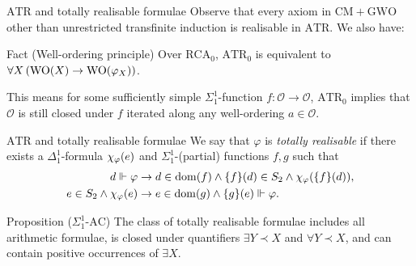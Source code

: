 \documentclass{beamer}
\DeclareMathOperator{\dom}{dom}
\DeclareMathOperator{\WO}{WO}
\begin{document}
\begin{frame}{$\mathrm{ATR}$ and totally realisable formulae}
  Observe that every axiom in $\mathrm{CM} + \mathrm{GWO}$ other than unrestricted transfinite induction is realisable in $\mathrm{ATR}$. We also have:

  \vspace*{8pt}

  \begin{block}{Fact (Well-ordering principle)}
    Over $\mathrm{RCA}_0$, $\mathrm{ATR}_0$ is equivalent to $\forall X \left(\WO\mleft(X\mright) \rightarrow \WO\mleft(\varphi_X\mright)\right)$.
  \end{block}

  \vspace*{8pt}
  \justifying

  This means for some sufficiently simple $\Sigma^1_1$-function $f : \mathcal{O} \rightarrow \mathcal{O}$, $\mathrm{ATR}_0$ implies that $\mathcal{O}$ is still closed under $f$ iterated along any well-ordering $a \in \mathcal{O}$.

  \nocite{rathjen22-well-ordering-principles}
\end{frame}

\begin{frame}{$\mathrm{ATR}$ and totally realisable formulae}
  We say that $\varphi$ is \emph{totally realisable} if there exists a $\Delta^1_1$-formula $\chi_\varphi\mleft(e\mright)$ and $\Sigma^1_1$-(partial) functions $f, g$ such that
  \begin{align*}
    d \Vdash \varphi                             & \rightarrow d \in \dom\mleft(f\mright) \land \mleft\{f\mright\}\mleft(d\mright) \in S_2 \land \chi_\varphi\mleft(\mleft\{f\mright\}\mleft(d\mright)\mright), \\
    e \in S_2 \land \chi_\varphi\mleft(e\mright) & \rightarrow e \in \dom\mleft(g\mright) \land \mleft\{g\mright\}\mleft(e\mright) \Vdash \varphi.
  \end{align*}

  \begin{block}{Proposition ($\Sigma^1_1$-$\mathrm{AC}$)}
    \justifying
    The class of totally realisable formulae includes all arithmetic formulae, is closed under quantifiers $\exists Y \prec X$ and $\forall Y \prec X$, and can contain positive occurrences of $\exists X$.
  \end{block}
\end{frame}
\end{document}
